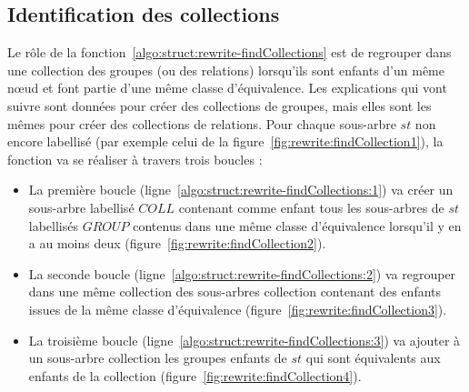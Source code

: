 \subsection{Identification des collections}
Le rôle de la fonction~\ref{algo:struct:rewrite-findCollections} est de regrouper dans une collection des groupes (ou des relations) lorsqu'ils sont enfants d'un même nœud et font partie d'une même classe d'équivalence.
Les explications qui vont suivre sont données pour créer des collections de groupes, mais elles sont les mêmes pour créer des collections de relations.
Pour chaque sous-arbre $st$ non encore labellisé (par exemple celui de la figure~\ref{fig:rewrite:findCollection1}), la fonction va se réaliser à travers trois boucles :
\begin{itemize}
    \item La première boucle (ligne~\ref{algo:struct:rewrite-findCollections:1}) va créer un sous-arbre labellisé $COLL$ contenant comme enfant tous les sous-arbres de $st$ labellisés $GROUP$ contenus dans une même classe d'équivalence lorsqu'il y en a au moins deux (figure~\ref{fig:rewrite:findCollection2}).
    \item La seconde boucle (ligne~\ref{algo:struct:rewrite-findCollections:2}) va regrouper dans une même collection des sous-arbres collection contenant des enfants issues de la même classe d'équivalence (figure~\ref{fig:rewrite:findCollection3}).
    \item La troisième boucle (ligne~\ref{algo:struct:rewrite-findCollections:3}) va ajouter à un sous-arbre collection les groupes enfants de $st$ qui sont équivalents aux enfants de la collection (figure~\ref{fig:rewrite:findCollection4}).
 \end{itemize}

